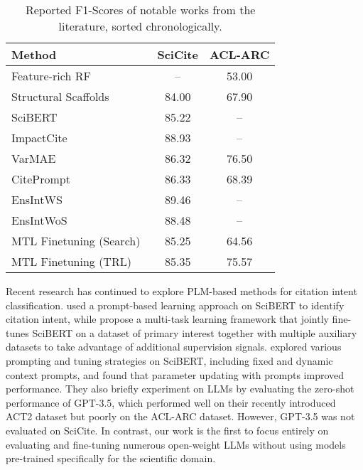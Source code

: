 \begin{table}[t]
    \centering
    \scriptsize
    \begin{tabular}{lcc}
        \toprule
        \textbf{Method}                                     & \textbf{SciCite}  & \textbf{ACL-ARC}  \\
        \midrule
        Feature-rich RF~\citep{JKH2018}                     & --                & 53.00 \\
        Structural Scaffolds~\citep{CAZ2019}                & 84.00             & 67.90              \\
        SciBERT~\citep{BLC2019}                             & 85.22             & --                \\
        ImpactCite~\citep{MRR2021}                          & 88.93             & --                \\
        VarMAE~\cite{HHD2022}                               & 86.32             & 76.50             \\
        CitePrompt~\citep{LSM2023}                          & 86.33             & 68.39             \\
        EnsIntWS~\citep{PVD2024}                            & 89.46             & --                \\
        EnsIntWoS~\citep{PVD2024}                           & 88.48             & --                \\
        MTL Finetuning (Search)~\citep{SKK2024}             & 85.25             & 64.56             \\
        MTL Finetuning (TRL)~\citep{SKK2024}                & 85.35             & 75.57             \\
        \bottomrule
        \end{tabular}
        \caption{Reported F1-Scores of notable works from the literature, sorted chronologically.}\label{tab:literature-f1}
\end{table}

Recent research has continued to explore PLM-based methods for citation intent classification. \citet{LSM2023} used a prompt-based learning approach on SciBERT to identify citation intent, while \citet{SKK2024} propose a multi-task learning framework that jointly fine-tunes SciBERT on a dataset of primary interest together with multiple auxiliary datasets to take advantage of additional supervision signals. \citet{KPK2023} explored various prompting and tuning strategies on SciBERT, including fixed and dynamic context prompts, and found that parameter updating with prompts improved performance. They also briefly experiment on LLMs by evaluating the zero-shot performance of GPT-3.5, which performed well on their recently introduced ACT2 dataset but poorly on the ACL-ARC dataset. However, GPT-3.5 was not evaluated on SciCite. In contrast, our work is the first to focus entirely on evaluating and fine-tuning numerous open-weight LLMs without using models pre-trained specifically for the scientific domain. 

